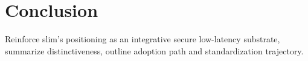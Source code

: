 \documentclass{article}
\theoremstyle{definition}
\theoremstyle{remark}
\begin{document}
\section{Conclusion}\label{sec:conclusion}
Reinforce \gls{slim}'s positioning as an integrative secure low-latency
substrate, summarize distinctiveness, outline adoption path and
standardization trajectory.

\printglossaries



\end{document}
